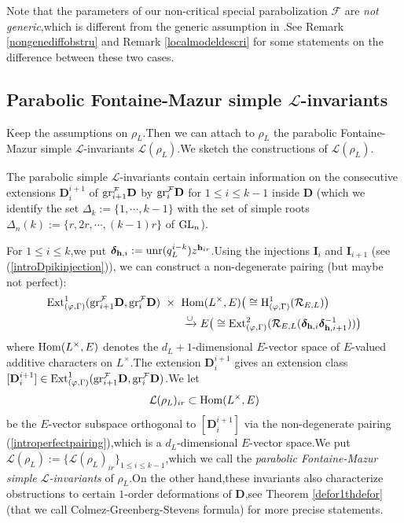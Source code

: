 \documentclass[SecEq,CM,GP]{degruyter-crelle} %
\theoremstyle{plain}
\newcommand{\Dpik}{{\mathbf{D}}}
\newcommand{\ext}{{\rm Ext}}
\newcommand{\GLN}{{\rm GL}}
\newcommand{\gr}{{\rm gr}}
\newcommand{\homo}{{\rm Hom}}
\newcommand{\hH}{{\mathrm{H}}}
\newcommand{\hpi}{{{\mathbf{h}}}}
\newcommand{\unr}{{\rm unr}}
\newcommand{\bh}{{\mathbf{h}}}
\newcommand{\cR}{\mathcal R}
\newcommand{\cF}{\mathcal F}
\newcommand{\sL}{\mathcal L}
\begin{document}
Note that the parameters of our non-critical special parabolization $\cF$ are \textit{not generic},\;which is different from the generic assumption in \cite[(4.13)]{Ding2021}.\;See Remark \ref{nongenediffobstru} and  Remark \ref{localmodeldescri} for some statements on the difference between these two cases.\;


\subsection*{Parabolic Fontaine-Mazur simple $\sL$-invariants}

Keep the assumptions on $\rho_L$.\;Then we can attach to $\rho_L$ the parabolic Fontaine-Mazur simple $\sL$-invariants $\sL(\rho_L)$.\;We sketch the constructions of $\sL(\rho_L)$.\;

The parabolic simple $\sL$-invariants contain certain information on the consecutive extensions $\Dpik_i^{i+1}$ of $\gr_{i+1}^{\cF}\Dpik$ by $\gr_{i}^{\cF}\Dpik$ for $1\leq i\leq k-1$ inside $\Dpik$ (which we identify the set $\Delta_k:=\{1,\cdots,k-1\}$ with the set of simple roots $\Delta_n(k):=\{r,2r,\cdots,(k-1)r\}$ of $\GLN_n$).\;

For $1\leq i\leq k$,\;we  put $\bm{\delta}_{\bh,i}:=\unr(q_L^{i-k})z^{\hpi_{ir}}$.\;Using the injections $\mathbf{I}_{i}$ and $\mathbf{I}_{i+1}$  (see (\ref{introDpikinjection})),\;
we can construct a non-degenerate pairing (but maybe not perfect):
\begin{equation}\label{introperfectpairing}
	\begin{aligned}
		\ext^1_{(\varphi,\Gamma)}(\gr_{i+1}^{\cF} \Dpik,\gr_{i}^{\cF}\Dpik)  \;\;\times\;\;  &\homo(L^\times,E) \big(\cong \hH^1_{(\varphi,\Gamma)}(\cR_{E,L})\big) \\      &\xrightarrow{\cup}
		E\big(\cong\ext^2_{(\varphi,\Gamma)}(\cR_{E,L}(\bm{\delta}_{\bh,i}\bm{\delta}^{-1}_{\bh,i+1}))\big)
	\end{aligned}
\end{equation}
where $\homo(L^\times,E)$ denotes the $d_L+1$-dimensional $E$-vector space of $E$-valued additive characters on $L^\times$.\;The extension $\Dpik_i^{i+1}$ gives an extension class $[\Dpik_{i}^{i+1}]\in \ext^1_{(\varphi,\Gamma)}(\gr_{i+1}^{\cF} \Dpik,\gr_{i}^{\cF}\Dpik)$.\;We let
\[\sL(\rho_L)_{ir}\subset \homo(L^\times,E)\]
be the $E$-vector subspace orthogonal to $[\Dpik_{i}^{i+1}]$ via the non-degenerate pairing  (\ref{introperfectpairing}),\;which is a $d_L$-dimensional $E$-vector space.\;We put $\sL(\rho_L):=\{\sL(\rho_L)_{ir}\}_{1\leq i\leq k-1}$,\;which we call the \textit{parabolic Fontaine-Mazur simple $\sL$-invariants} of $\rho_L$.\;On the other hand,\;these invariants also characterize obstructions to certain
$1$-order deformations of $\Dpik$,\;see Theorem \ref{defor1thdefor} (that we call Colmez-Greenberg-Stevens formula) for more precise statements.\;
\end{document}
